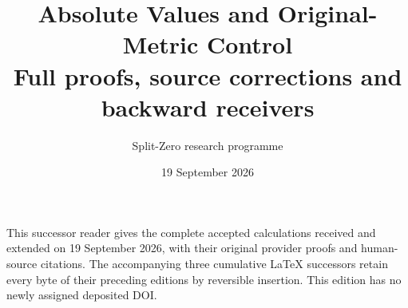 \documentclass[11pt,a4paper]{article}
\title{Absolute Values and Original-Metric Control\\[0.6em]\large Full proofs, source corrections and backward receivers}
\author{Split-Zero research programme}
\date{19 September 2026}
\begin{document}
\maketitle
\noindent This successor reader gives the complete accepted calculations received and
extended on 19 September 2026, with their original provider proofs and
human-source citations. The accompanying three cumulative LaTeX successors
retain every byte of their preceding editions by reversible insertion.
This edition has no newly assigned deposited DOI.
\tableofcontents
\end{document}
